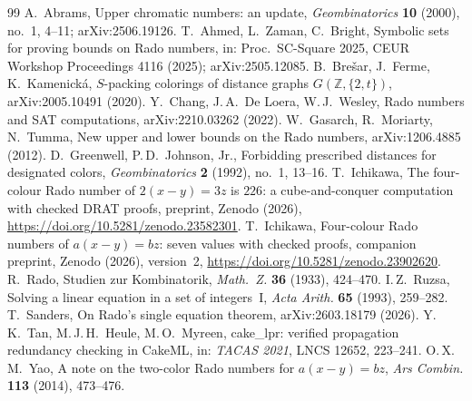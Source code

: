\documentclass[11pt,a4paper]{article}
\theoremstyle{definition}
\theoremstyle{remark}
\begin{document}
\clearpage
\begin{thebibliography}{99}
 A.~Abrams, Upper chromatic numbers: an update, \emph{Geombinatorics} \textbf{10} (2000), no.~1, 4--11; arXiv:2506.19126.
 T.~Ahmed, L.~Zaman, C.~Bright, Symbolic sets for proving bounds on Rado numbers, in: Proc.\ SC-Square 2025, CEUR Workshop Proceedings 4116 (2025); arXiv:2505.12085.
 B.~Bre\v{s}ar, J.~Ferme, K.~Kamenick\'a, $S$-packing colorings of distance graphs $G(\mathbb Z,\{2,t\})$, arXiv:2005.10491 (2020).
 Y.~Chang, J.\,A.~De Loera, W.\,J.~Wesley, Rado numbers and SAT computations, arXiv:2210.03262 (2022).
 W.~Gasarch, R.~Moriarty, N.~Tumma, New upper and lower bounds on the Rado numbers, arXiv:1206.4885 (2012).
 D.~Greenwell, P.\,D.~Johnson, Jr., Forbidding prescribed distances for designated colors, \emph{Geombinatorics} \textbf{2} (1992), no.~1, 13--16.
 T.~Ichikawa, The four-colour Rado number of $2(x-y)=3z$ is $226$: a cube-and-conquer computation with checked DRAT proofs, preprint, Zenodo (2026), \url{https://doi.org/10.5281/zenodo.23582301}.
 T.~Ichikawa, Four-colour Rado numbers of $a(x-y)=bz$: seven values with checked proofs, companion preprint, Zenodo (2026), version~2, \url{https://doi.org/10.5281/zenodo.23902620}.
 R.~Rado, Studien zur Kombinatorik, \emph{Math.\ Z.} \textbf{36} (1933), 424--470.
 I.\,Z.~Ruzsa, Solving a linear equation in a set of integers~I, \emph{Acta Arith.} \textbf{65} (1993), 259--282.
 T.~Sanders, On Rado's single equation theorem, arXiv:2603.18179 (2026).
 Y.\,K.~Tan, M.\,J.\,H.~Heule, M.\,O.~Myreen, cake\_lpr: verified propagation redundancy checking in CakeML, in: \emph{TACAS 2021}, LNCS 12652, 223--241.
 O.\,X.\,M.~Yao, A note on the two-color Rado numbers for $a(x-y)=bz$, \emph{Ars Combin.} \textbf{113} (2014), 473--476.
\end{thebibliography}
\end{document}
